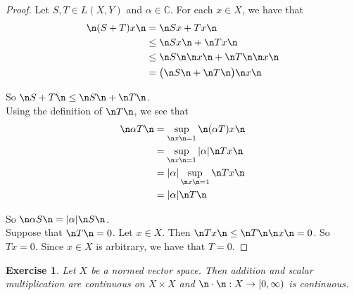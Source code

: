 \documentclass[12pt]{amsart}
\newtheorem{ex}[thm]{Exercise}
\newcommand{\al}{\alpha}
\newcommand{\C}{\mathbb{C}}
\newcommand{\Rg}{[0,\infty)}
\begin{document}
\begin{proof}
	Let $S,T \in L(X,Y)$ and $\al \in \C$. For each $x \in X$, we have that 
	\begin{align*}
		\n (S+T)x \n
		&= \n Sx+Tx \n \\
		& \leq \n Sx \n + \n Tx \n \\
		&\leq \n S \n \n x \n + \n T \n \n x \n \\
		&= \big(\n S \n + \n T \n \big) \n x \n
	\end{align*}
	
	So $\n S+T \n \leq \n S \n + \n T \n$.\vspace{1cm}\\
	
	Using the definition of $\n T \n$, we see that 
	\begin{align*}
		\n \al T \n 
		&= \sup_{\n x \n =1} \n (\al T)x \n \\
		&= \sup_{\n x \n =1} \vert \al \vert \n Tx \n\\
		&=\vert \al \vert \sup_{\n x \n =1} \n Tx \n \\
		&=\vert \al \vert \n T \n
	\end{align*} 
	
	So $\n \al S \n = \vert \al \vert \n S \n $. \vspace{1cm}\\ Suppose that $\n T \n = 0$. Let $x \in X$. Then $\n T x\n \leq \n T \n \n x \n = 0$. So $Tx=0$. Since $x \in X$ is arbitrary, we have that $T=0$. 
\end{proof}

\begin{ex}
	Let $X$ be a normed vector space. Then addition and scalar multiplication are continuous on $X \times X$ and $\n \cdot \n:X \rightarrow \Rg$ is continuous.
\end{ex}
\end{document}
